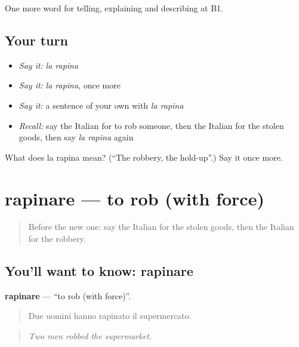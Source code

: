 \begin{grammarlens}[title={What you've built}]
One more word for telling, explaining and describing at B1.
\end{grammarlens}

\subsection*{Your turn}
\begin{itemize}
\raggedright
  \item \emph{Say it:} \emph{la rapina}
  \item \emph{Say it:} \emph{la rapina}, once more
  \item \emph{Say it:} a sentence of your own with \emph{la rapina}
  \item \emph{Recall:} say the Italian for to rob someone, then the Italian for the stolen goods, then say \emph{la rapina} again
\end{itemize}

\begin{tcolorbox}[breakable,colback=teal!4,colframe=teal!35!black,title={Before you move on}]
What does la rapina mean? (\textquotedblleft{}The robbery, the hold-up\textquotedblright{}.) Say it once more.
\end{tcolorbox}
\section[rapinare]{rapinare — to rob (with force)}

\label{lesson:IT-C292-rapinare}



\begin{quote}
Before the new one: say the Italian for the stolen goods, then the Italian for the robbery.
\end{quote}

\subsection*{You'll want to know: rapinare}
\textbf{rapinare} — \textquotedblleft{}to rob (with force)\textquotedblright{}.

\begin{quote}
Due uomini hanno rapinato il supermercato.
\end{quote}

\begin{quote}
\emph{Two men robbed the supermarket.}
\end{quote}

